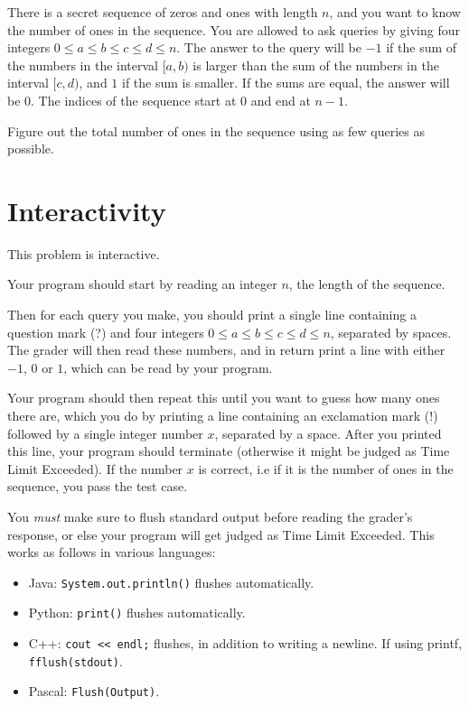There is a secret sequence of zeros and ones with length $n$, and you want to know the number of ones in the sequence.
You are allowed to ask queries by giving four integers $0 \leq a \leq b \leq c \leq d \leq n$. The answer
to the query will be $-1$ if the sum of the numbers in the interval $[a,b)$ is larger than the sum of the numbers
in the interval $[c,d)$, and $1$ if the sum is smaller. If the sums are equal, the answer will be $0$.
The indices of the sequence start at $0$ and end at $n-1$.

Figure out the total number of ones in the sequence using as few queries as possible.

\section*{Interactivity}
This problem is interactive.

Your program should start by reading an integer $n$, the length of the sequence.

Then for each query you make, you should print a single line containing a question mark (?) and
four integers $0 \leq a \leq b \leq c \leq d \leq n$, separated by spaces.
The grader will then read these numbers, and in return print a line with either $-1$, $0$ or $1$, which can be read by your program.

Your program should then repeat this until you want to guess how many ones there are,
which you do by printing a line containing an exclamation mark (!) followed by a single integer number $x$, separated by a space.
After you printed this line, your program should terminate (otherwise it might be judged as Time Limit Exceeded).
If the number $x$ is correct, i.e if it is the number of ones in the sequence, you pass the test case.

You \emph{must} make sure to flush standard output before reading the grader's response, or else your program
will get judged as Time Limit Exceeded. This works as follows in various languages:
\begin{itemize}
  \item Java: \texttt{System.out.println()} flushes automatically.
  \item Python: \texttt{print()} flushes automatically.
  \item C++: \texttt{cout << endl;} flushes, in addition to writing a newline. If using printf, \texttt{fflush(stdout)}.
  \item Pascal: \texttt{Flush(Output)}.
\end{itemize}

